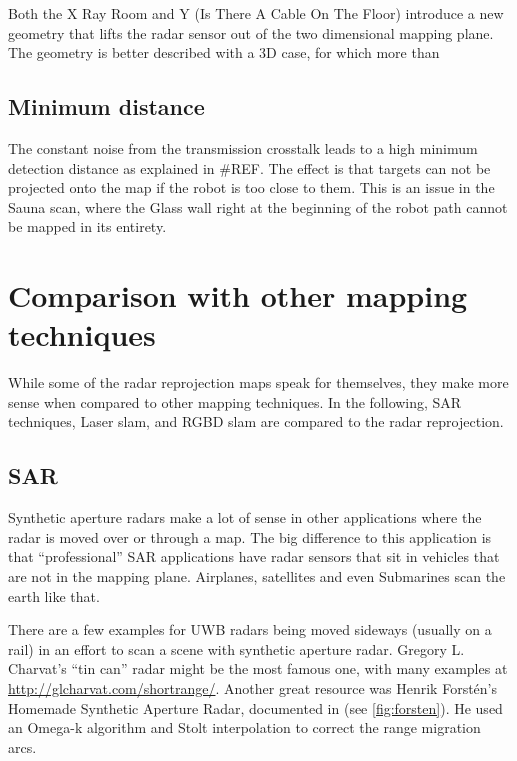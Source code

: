Both the X Ray Room and Y (Is There A Cable On The Floor) introduce a
new geometry that lifts the radar sensor out of the two dimensional
mapping plane. The geometry is better described with a 3D case, for
which more than

\subsection{Minimum distance}\label{minimum-distance}

The constant noise from the transmission crosstalk leads to a high
minimum detection distance as explained in \#REF. The effect is that
targets can not be projected onto the map if the robot is too close to
them. This is an issue in the Sauna scan, where the Glass wall right at
the beginning of the robot path cannot be mapped in its entirety.



\section{Comparison with other mapping techniques} \label{comparison-with-other-mapping-techniques}

While some of the radar reprojection maps speak for themselves, they
make more sense when compared to other mapping techniques. In the
following, SAR techniques, Laser slam, and RGBD slam are compared to the
radar reprojection.

\subsection{SAR}\label{sar-1}
Synthetic aperture radars make a lot of sense in other applications
where the radar is moved over or through a map. The big difference to
this application is that ``professional'' SAR applications have radar
sensors that sit in vehicles that are not in the mapping plane.
Airplanes, satellites and even Submarines scan the earth like that.

There are a few examples for UWB radars being moved sideways (usually on a rail) in an effort to scan a scene with synthetic aperture radar.
Gregory L. Charvat's ``tin can'' radar \cite{Charvat2014} might be the most famous one, with many examples at \url{http://glcharvat.com/shortrange/}.
Another great resource was Henrik Forstén's Homemade Synthetic Aperture
Radar, documented in \cite{Forsten2015} (see \cref{fig:forsten}). He used an Omega-k algorithm \cite{Tolman2008} and Stolt interpolation \cite{Cumming2004} to correct the range migration arcs.

